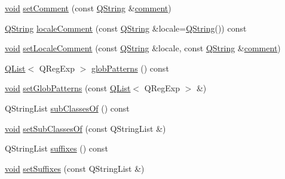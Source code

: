 \begin{DoxyCompactItemize}
\item 
\hyperlink{group___u_a_v_objects_plugin_ga444cf2ff3f0ecbe028adce838d373f5c}{void} \hyperlink{group___core_plugin_gaeb4813225c69cf8b6d4519ff37f86bb3}{set\-Comment} (const \hyperlink{group___u_a_v_objects_plugin_gab9d252f49c333c94a72f97ce3105a32d}{Q\-String} \&\hyperlink{group___core_plugin_ga79389186e4424fcc76067de828c59672}{comment})
\item 
\hyperlink{group___u_a_v_objects_plugin_gab9d252f49c333c94a72f97ce3105a32d}{Q\-String} \hyperlink{group___core_plugin_gacec6ccfecf75f30c7cecc08ba360a567}{locale\-Comment} (const \hyperlink{group___u_a_v_objects_plugin_gab9d252f49c333c94a72f97ce3105a32d}{Q\-String} \&locale=\hyperlink{group___u_a_v_objects_plugin_gab9d252f49c333c94a72f97ce3105a32d}{Q\-String}()) const 
\item 
\hyperlink{group___u_a_v_objects_plugin_ga444cf2ff3f0ecbe028adce838d373f5c}{void} \hyperlink{group___core_plugin_ga6d1b6c3bf83a61abcca664ffbe0b7817}{set\-Locale\-Comment} (const \hyperlink{group___u_a_v_objects_plugin_gab9d252f49c333c94a72f97ce3105a32d}{Q\-String} \&locale, const \hyperlink{group___u_a_v_objects_plugin_gab9d252f49c333c94a72f97ce3105a32d}{Q\-String} \&\hyperlink{group___core_plugin_ga79389186e4424fcc76067de828c59672}{comment})
\item 
\hyperlink{class_q_list}{Q\-List}$<$ Q\-Reg\-Exp $>$ \hyperlink{group___core_plugin_ga5003d7a7007c7a14897a64179875f2e6}{glob\-Patterns} () const 
\item 
\hyperlink{group___u_a_v_objects_plugin_ga444cf2ff3f0ecbe028adce838d373f5c}{void} \hyperlink{group___core_plugin_ga7634b7f467d1dbe58df833d12d160733}{set\-Glob\-Patterns} (const \hyperlink{class_q_list}{Q\-List}$<$ Q\-Reg\-Exp $>$ \&)
\item 
Q\-String\-List \hyperlink{group___core_plugin_ga5cc67af21852909a1753c6a8caabed43}{sub\-Classes\-Of} () const 
\item 
\hyperlink{group___u_a_v_objects_plugin_ga444cf2ff3f0ecbe028adce838d373f5c}{void} \hyperlink{group___core_plugin_gab0ed6090ea2741206e77162c0b61345b}{set\-Sub\-Classes\-Of} (const Q\-String\-List \&)
\item 
Q\-String\-List \hyperlink{group___core_plugin_ga7adb5769df4eda33d940128aef849580}{suffixes} () const 
\item 
\hyperlink{group___u_a_v_objects_plugin_ga444cf2ff3f0ecbe028adce838d373f5c}{void} \hyperlink{group___core_plugin_ga37606c8c750409e81f32e8f168c846dd}{set\-Suffixes} (const Q\-String\-List \&)
\item 

\end{DoxyCompactItemize}
